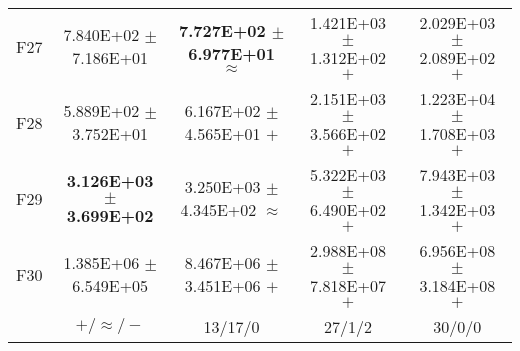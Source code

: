 \documentclass[paper]{ieice}
\begin{document}
\begin{table*}[htbp]
\begin{tabular}{c|c|c|c|c}
		F27	&	7.840E+02	$\pm$	7.186E+01		&	\textbf{7.727E+02	$\pm$	6.977E+01}	$\approx$	&	1.421E+03	$\pm$	1.312E+02	$+$	&	2.029E+03	$\pm$	2.089E+02	$+$	\\
		F28	&	5.889E+02	$\pm$	3.752E+01		&	6.167E+02	$\pm$	4.565E+01	$+$	&	2.151E+03	$\pm$	3.566E+02	$+$	&	1.223E+04	$\pm$	1.708E+03	$+$	\\
		F29	&	\textbf{3.126E+03	$\pm$	3.699E+02}		&	3.250E+03	$\pm$	4.345E+02	$\approx$	&	5.322E+03	$\pm$	6.490E+02	$+$	&	7.943E+03	$\pm$	1.342E+03	$+$	\\
		F30	&	1.385E+06	$\pm$	6.549E+05		&	8.467E+06	$\pm$	3.451E+06	$+$	&	2.988E+08	$\pm$	7.818E+07	$+$	&	6.956E+08	$\pm$	3.184E+08	$+$	\\  \hline
		
		&	$+/\approx/-$				&	13/17/0				&	27/1/2				&	30/0/0				\\ \hline
		

\end{tabular}
\end{table*}
\end{document}
